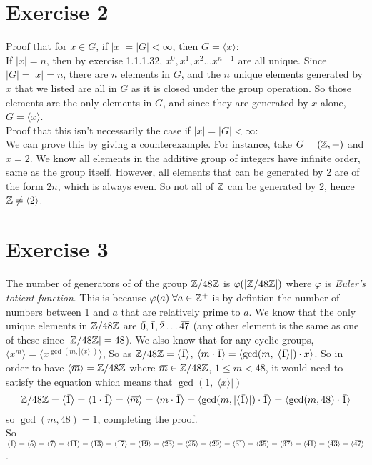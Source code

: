 \documentclass[12pt]{article}
\begin{document}
    
    \section*{Exercise 2}
    Proof that for $x \in G$, if $|x| = |G| < \infty$,
    then $G = \langle x \rangle:$ \\
    If $|x| = n$,
    then by exercise 1.1.1.32,
    $x^0, x^1, x^2 \dots x^{n-1}$ are all unique.
    Since $|G| = |x| = n$,
    there are $n$ elements in $G$,
    and the $n$ unique elements generated by $x$ that we listed
    are all in $G$ as it is closed under the group operation.
    So those elements are the only elements in $G$,
    and since they are generated by $x$ alone, 
    $G = \langle x \rangle$. \\
    Proof that this isn't necessarily the case if $|x| = |G| < \infty$: \\
    We can prove this by giving a counterexample.
    For instance, take $G = (\mathbb{Z}, +)$ and $x = 2$.
    We know all elements in the additive group of integers have
    infinite order,
    same as the group itself.
    However, all elements that can be generated by 2 are of the form $2n$,
    which is always even.
    So not all of $\mathbb{Z}$ can be generated by 2,
    hence $\mathbb{Z} \neq \langle 2 \rangle$.


    \section*{Exercise 3}
    The number of generators of of the group $\mathbb{Z}/48\mathbb{Z}$
    is $\varphi(|\mathbb{Z}/48\mathbb{Z}|)$ where $\varphi$
    is \textit{Euler's totient function}.
    This is because $\varphi(a) \; \forall a \in \mathbb{Z}^+$
    is by defintion the number of numbers between 1 and $a$
    that are relatively prime to $a$.
    We know that the only unique elements in $\mathbb{Z}/48\mathbb{Z}$
    are $\,\overline{\!{0}}, \,\overline{\!{1}}, \,\overline{\!{2}} \dots \,\overline{\!{47}}$
    (any other element is the same as one of these since $|\mathbb{Z}/48\mathbb{Z}| = 48$).
    We also know that for any cyclic groups,
    $\langle x^m \rangle = \langle x^{\gcd(m, |\langle x \rangle|)} \rangle$,
    So as $\mathbb{Z}/48\mathbb{Z} = \langle \,\overline{\!{1}} \rangle$,
    $\langle m \cdot \,\overline{\!{1}} \rangle
    = \langle \gcd(m, |\langle \,\overline{\!{1}} \rangle|) \cdot x \rangle$.
    So in order to have $\langle \,\overline{\!{m}} \rangle = \mathbb{Z}/48\mathbb{Z}$
    where $\,\overline{\!{m}} \in \mathbb{Z}/48\mathbb{Z}$, $1 \leqslant m < 48$,
    it would need to satisfy the equation
    which means that $\gcd(1, |\langle x \rangle|)$
    \[ \mathbb{Z}/48\mathbb{Z} = \langle \,\overline{\!{1}} \rangle
    =  \langle 1 \cdot \,\overline{\!{1}} \rangle
    =  \langle \,\overline{\!{m}} \rangle
    =  \langle m \cdot \,\overline{\!{1}} \rangle
    =  \langle \gcd(m, |\langle \,\overline{\!{1}} \rangle|) \cdot \,\overline{\!{1}} \rangle
    =  \langle \gcd(m, 48) \cdot \,\overline{\!{1}} \rangle \]
    so $\gcd(m, 48) = 1$,
    completing the proof. \\
    So $\langle \olsi{1} \rangle
    = \langle \olsi{5} \rangle = \langle \olsi{7} \rangle
    = \langle \olsi{11} \rangle = \langle \olsi{13} \rangle
    = \langle \olsi{17} \rangle = \langle \olsi{19} \rangle
    = \langle \olsi{23} \rangle = \langle \olsi{25} \rangle
    = \langle \olsi{29} \rangle = \langle \olsi{31} \rangle
    = \langle \olsi{35} \rangle = \langle \olsi{37} \rangle
    = \langle \olsi{41} \rangle = \langle \olsi{43} \rangle
    = \langle \olsi{47} \rangle$.
\end{document}
